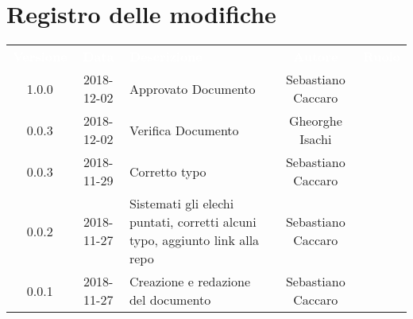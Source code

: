 \section*{Registro delle modifiche}
{
	\renewcommand{\arraystretch}{1.5}
	\centering
	\begin{longtable}{ c c  C{4cm}  c  c }
		
		\textcolor{white}{\textbf{Versione}} & \textcolor{white}{\textbf{Data}} & \textcolor{white}{\textbf{Descrizione}} & \textcolor{white}{\textbf{Autore}} & \textcolor{white}{\textbf{Ruolo}}\\
		1.0.0 & 2018-12-02 & Approvato Documento & Sebastiano Caccaro & \reda{} \\
		
		0.0.3 & 2018-12-02 & Verifica Documento & Gheorghe Isachi & \ver{} \\		
				
		0.0.3 & 2018-11-29 & Corretto typo & Sebastiano Caccaro & \reda{} \\		
		
		0.0.2 & 2018-11-27 & Sistemati gli elechi puntati, corretti alcuni typo, aggiunto link alla repo & Sebastiano Caccaro & \reda{} \\
		
		0.0.1 & 2018-11-27 & Creazione e redazione del documento & Sebastiano Caccaro & \reda{}\\
		
	\end{longtable}

}